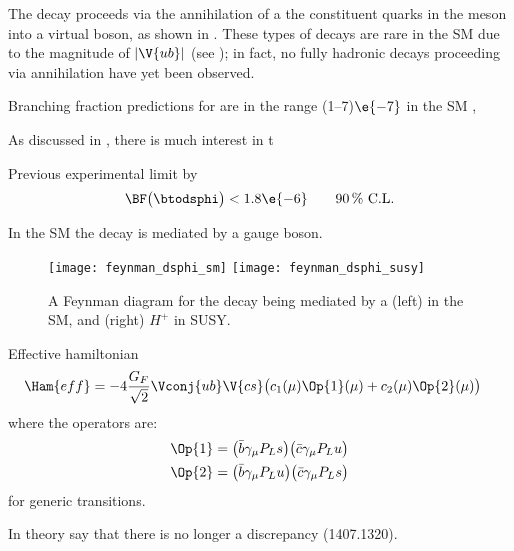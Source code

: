 The decay \btodsphi proceeds via the annihilation of a the constituent quarks in the \Bp meson into
a virtual \Wp boson, as shown in .
These types of decays are rare in the SM due to the magnitude of $|\V{ub}|$ (see );
in fact, no fully hadronic decays proceeding via annihilation have yet been observed.

Branching fraction predictions for \btodsphi are in the range (1--7)$\e{-7}$ in the SM
\cite{Zou:2009zza,Mohanta:2002wf,PhysRevD.76.057701,Lu:2001yz},

As discussed in , there is much interest in t

Previous experimental limit by \babar \cite{Aubert:2005gd}
\begin{equation}
  \BF\big(\btodsphi\big) < 1.8\e{-6} \qquad \text{90\,\% C.L.}
\end{equation}


In the SM the decay is mediated by a \Wp gauge boson.

\begin{figure}
  \begin{center}
    \texttt{[image: feynman\_dsphi\_sm]}
    \texttt{[image: feynman\_dsphi\_susy]}
    \caption{\small
      A Feynman diagram for the decay \btodsphi being mediated by a
      (left) \Wp in the SM, and
      (right) $H^+$ in SUSY.
    }
    \label{fig:dsphi:feyn}
  \end{center}
\end{figure}



Effective hamiltonian
\begin{align}
  \Ham{eff} &= -4\frac{G_F}{\sqrt{2}}\Vconj{ub}\V{cs}
  \big(
  c_1(\mu)\Op{1}(\mu) + c_2(\mu)\Op{2}(\mu)
  \big)
\end{align}
where the operators are:
\begin{align}
  \Op{1} &= \big(\bar b\gamma_\mu P_Ls\big) \big(\bar c\gamma_\mu P_Lu\big) \nonumber\\
  \Op{2} &= \big(\bar b\gamma_\mu P_Lu\big) \big(\bar c\gamma_\mu P_Ls\big)
\end{align}
\cite{Buchalla:1995vs}
for generic  transitions.

























In theory say that there is no longer a discrepancy (1407.1320).
\cite{PDG2012}
